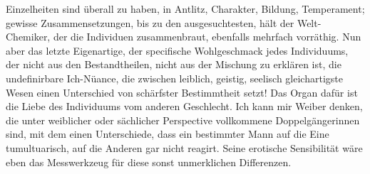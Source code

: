 Einzelheiten sind überall zu haben, in Antlitz, Charakter, Bildung, Temperament; gewisse Zusammensetzungen, bis zu den ausgesuchtesten, hält der Welt-Chemiker, der die Individuen zusammenbraut, ebenfalls mehrfach vorräthig. Nun aber das letzte Eigenartige, der specifische Wohlgeschmack jedes Individuums, der nicht aus den Bestandtheilen, nicht aus der Mischung zu erklären ist, die undefinirbare Ich-Nüance, die zwischen leiblich, geistig, seelisch gleichartigste Wesen einen Unterschied von schärfster Bestimmtheit setzt! Das Organ dafür ist die Liebe des Individuums vom anderen Geschlecht. Ich kann mir Weiber denken, die unter weiblicher oder sächlicher Perspective vollkommene Doppelgängerinnen sind, mit dem einen Unterschiede, dass ein bestimmter Mann auf die Eine tumultuarisch, auf die Anderen gar nicht reagirt. Seine erotische Sensibilität wäre eben das Messwerkzeug für diese sonst unmerklichen Differenzen.
\par

